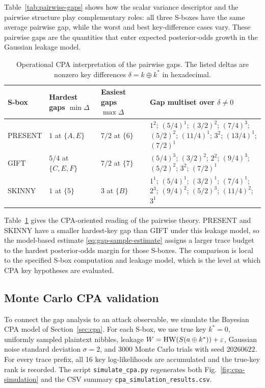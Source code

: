 Table~\ref{tab:pairwise-gaps} shows how the scalar variance descriptor and the
pairwise structure play complementary roles: all three S-boxes have the same
average pairwise gap, while the worst and best key-difference cases vary.
These pairwise gaps are the
quantities that enter expected posterior-odds growth in the Gaussian leakage
model.

\begin{table}[t]
\centering
\caption{Operational CPA interpretation of the pairwise gaps.  The listed
deltas are nonzero key differences $\delta=k\oplus k^*$ in hexadecimal.}
\label{tab:gap-distribution}
\scriptsize
\setlength{\tabcolsep}{2pt}
\begin{tabular}{@{}p{}p{}p{}p{}@{}}
\toprule
S-box & Hardest gaps $\min\Delta$ & Easiest gaps $\max\Delta$ &
Gap multiset over $\delta\neq0$ \\
\midrule
PRESENT & $1$ at $\{A,E\}$ & $7/2$ at $\{6\}$ &
$1^2$; $(5/4)^1$; $(3/2)^2$; $(7/4)^3$; $(5/2)^2$;
$(11/4)^1$; $3^2$; $(13/4)^1$; $(7/2)^1$ \\
GIFT & $5/4$ at $\{C,E,F\}$ & $7/2$ at $\{7\}$ &
$(5/4)^3$; $(3/2)^2$; $2^2$; $(9/4)^3$; $(5/2)^2$;
$3^2$; $(7/2)^1$ \\
SKINNY & $1$ at $\{5\}$ & $3$ at $\{B\}$ &
$1^1$; $(5/4)^1$; $(3/2)^1$; $(7/4)^1$; $2^3$;
$(9/4)^2$; $(5/2)^3$; $(11/4)^2$; $3^1$ \\
\bottomrule
\end{tabular}
\end{table}

Table~\ref{tab:gap-distribution} gives the CPA-oriented reading of the
pairwise theory.  PRESENT and SKINNY have a smaller hardest-key gap than GIFT
under this leakage model, so the model-based estimate
\eqref{eq:gap-sample-estimate} assigns a larger trace budget to the hardest
posterior-odds margin for those S-boxes.  The comparison is local to the
specified S-box computation and leakage model, which is the level at which CPA
key hypotheses are evaluated.

\subsection{Monte Carlo CPA validation}\label{subsec:cpa-simulation}

To connect the gap analysis to an attack observable, we simulate the Bayesian
CPA model of Section~\ref{sec:cpa}.  For each S-box, we use true key
$k^*=0$, uniformly sampled plaintext nibbles, leakage
$W=\mathrm{HW}(S(a\oplus k^*))+\varepsilon$, Gaussian noise standard deviation
$\sigma=2$, and $3000$ Monte Carlo trials with seed $20260622$.  For every
trace prefix, all 16 key log-likelihoods are accumulated and the true-key rank
is recorded.  The script \texttt{simulate\_cpa.py} regenerates both
Fig.~\ref{fig:cpa-simulation} and the CSV summary
\texttt{cpa\_simulation\_results.csv}.

